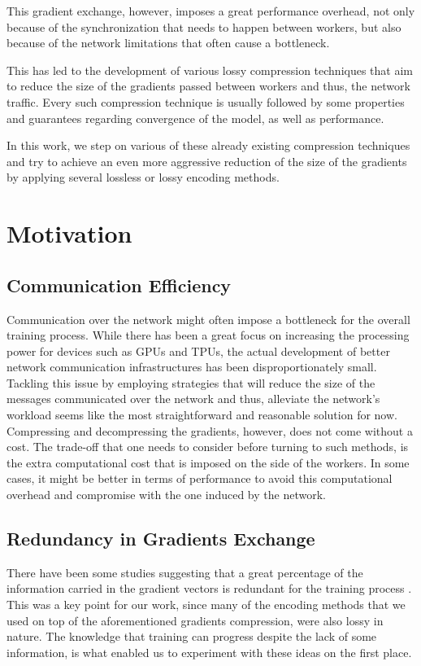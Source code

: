     This gradient exchange, however, imposes a great performance overhead, not only because of the synchronization that needs to happen between workers, but also because of the network limitations that often cause a bottleneck. 
    
    This has led to the development of various lossy compression techniques that aim to reduce the size of the gradients passed between workers and thus, the network traffic.
    Every such compression technique is usually followed by some properties and guarantees regarding convergence of the model, as well as performance. 
    
    In this work, we step on various of these already existing compression techniques and try to achieve an even more aggressive reduction of the size of the gradients by applying several lossless or lossy encoding methods.

    \section{Motivation}
        \subsection{Communication Efficiency}
            Communication over the network might often impose a bottleneck for the overall training process. 
            While there has been a great focus on increasing the processing power for devices such as GPUs and TPUs, the actual development of better network communication infrastructures has been disproportionately small. Tackling this issue by employing strategies that will reduce the size of the messages communicated over the network and thus, alleviate the network's workload seems like the most straightforward and reasonable solution for now.
            Compressing and decompressing the gradients, however, does not come without a cost. The trade-off that one needs to consider before turning to such methods, is the extra computational cost that is imposed on the side of the workers. In some cases, it might be better in terms of performance to avoid this computational overhead and compromise with the one induced by the network.
        \subsection{Redundancy in Gradients Exchange}
            There have been some studies suggesting that a great percentage of the information carried in the gradient vectors is redundant for the training process \cite{lin2017deep}.
            This was a key point for our work, since many of the encoding methods that we used on top of the aforementioned gradients compression, were also lossy in nature. 
            The knowledge that training can progress despite the lack of some information, is what enabled us to experiment with these ideas on the first place.
